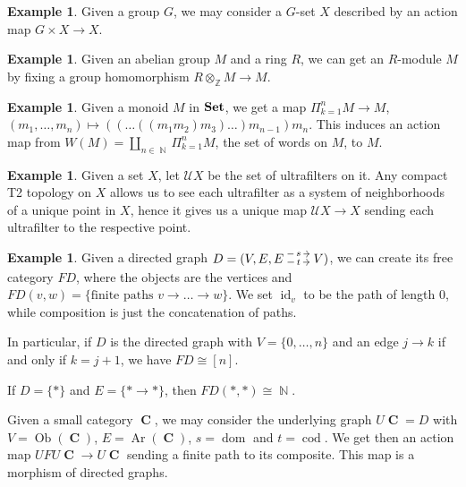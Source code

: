 \documentclass[a4paper,11pt,twoside, openany]{book}
\newcommand{\catname}[1]{{\normalfont\textbf{#1}}}
\newcommand{\Set}{\catname{Set}}
\DeclareMathOperator{\C}{\mathbf{C}}
\DeclareMathOperator{\N}{\mathbb{N}}
\DeclareMathOperator{\Z}{\mathbb{Z}}
\DeclareMathOperator{\id}{id}
\DeclareMathOperator{\dom}{dom}
\DeclareMathOperator{\cod}{cod}
\DeclareMathOperator{\Ob}{Ob}
\DeclareMathOperator{\Ar}{Ar}
\theoremstyle{definition}
\theoremstyle{definition}
\newtheorem{exmp}[thm]{Example} %
\theoremstyle{remark}
\begin{document}
	\begin{exmp}
		Given a group $G$, we may consider a $G$-set $X$ described by an action map $G\times X\rightarrow X$.
	\end{exmp}
	\begin{exmp}
		Given an abelian group $M$ and a ring $R$, we can get an $R$-module $M$ by fixing a group homomorphism $R\otimes_{\Z} M\rightarrow M$.
	\end{exmp}
	\begin{exmp}
		Given a monoid $M$ in $\Set$, we get a map $\Pi_{k=1}^n M\rightarrow M$, $(m_1,\ldots,m_n)\mapsto ((\ldots ((m_1m_2)m_3)\ldots )m_{n-1}) m_n$. This induces an action map from $W(M)=\amalg_{n\in\N}\Pi_{k=1}^n M$, the set of words on $M$, to $M$.
	\end{exmp}
	\begin{exmp}\label{ultrafilters}
		Given a set $X$, let $\mathcal{U}X$ be the set of ultrafilters on it. Any compact T2 topology on $X$ allows us to see each ultrafilter as a system of neighborhoods of a unique point in $X$, hence it gives us a unique map $\mathcal{U}X\rightarrow X$ sending each ultrafilter to the respective point.
	\end{exmp}
	\begin{exmp}
		Given a directed graph $D=(V,E,\hspace{-1.5mm}\begin{tikzcd}
		E\hspace{-1.5mm}\arrow[r, "t" description,  shift right=.5ex, shorten <= .3em, shorten >= .3em]  \arrow[r, "s" description, shift left=1ex, shorten <= .3em, shorten >= .3em] & \hspace{-1.5mm}V
		\end{tikzcd}\hspace{-1.5mm})$, we can create its free category $FD$, where the objects are the vertices and $FD(v,w)=\{\text{finite paths } v\rightarrow\ldots\rightarrow w\}$. We set $\id_v$ to be the path of length 0, while composition is just the concatenation of paths.
		
		In particular, if $D$ is the directed graph with $V=\{0,\ldots,n\}$ and an edge $j\rightarrow k$ if and only if $k=j+1$, we have $FD\cong [n]$.
		
		If $D=\{*\}$ and $E=\{*\rightarrow *\}$, then $FD(*,*)\cong\N$.
		
		Given a small category $\C$, we may consider the underlying graph $U\C=D$ with $V=\Ob(\C)$, $E=\Ar(\C)$, $s=\dom$ and $t=\cod$. We get then an action map $UFU\C\rightarrow U\C$ sending a finite path to its composite. This map is a morphism of directed graphs.
	\end{exmp}
\end{document}
